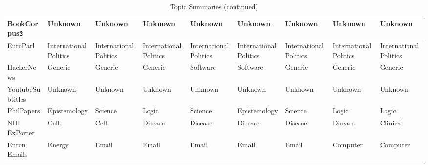 \documentclass[11pt,a4paper]{article}
\begin{document}
\begin{appendices}
\begin{table}[htb]
\begin{tiny}
\begin{tabular}{|p{}|p{}p{}p{}p{}p{}p{}p{}p{}|}
    BookCorpus2 & Unknown & Unknown & Unknown & Unknown & Unknown & Unknown & Unknown & Unknown\\\hline
    EuroParl & International Politics & International Politics & International Politics & International Politics & International Politics & International Politics & International Politics & International Politics\\\hline
    HackerNews & Generic & Generic & Generic & Software & Software & Generic & Generic & Generic\\\hline
    YoutubeSubtitles & Unknown & Unknown & Unknown & Unknown & Unknown & Unknown & Unknown & Unknown\\\hline
    PhilPapers & Epistemology & Science & Logic & Science & Epistemology & Science & Logic & Logic\\\hline
    NIH ExPorter & Cells & Cells & Disease & Disease & Disease & Disease & Disease & Clinical\\\hline
    Enron Emails & Energy & Email & Email & Email & Email & Email & Computer & Computer\\\hline
    \end{tabular}
\caption{Topic Summaries (continued)}
\end{tiny}
\end{table}


\end{appendices}
\end{document}
